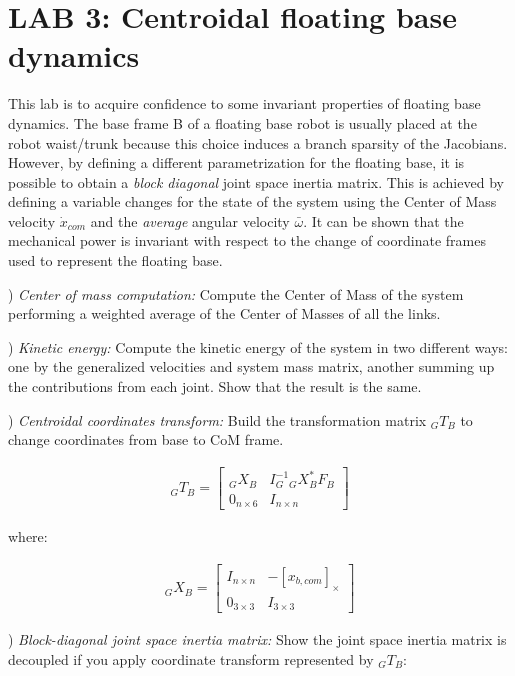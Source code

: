 \documentclass{report}
\newcommand{\mat}[1]{\ensuremath{\begin{bmatrix}#1\end{bmatrix}}}	%
\begin{document}
\section*{LAB 3: Centroidal floating base  dynamics}

This lab is to acquire confidence to some invariant properties of floating base dynamics. 
The base frame B of a floating base robot is usually placed at the robot waist/trunk because this choice induces a  branch sparsity of the Jacobians. 
However, by defining a different parametrization for the floating base, it is possible to obtain a \textit{block diagonal} joint space inertia matrix.  This is achieved by defining a variable changes for the state of the system using the Center of Mass velocity $\dot{x}_{com}$ and the \textit{average} angular velocity $\bar{\omega}$.  It can be shown that the mechanical power is invariant with respect to the change of coordinate frames used to represent the floating base. 

\quad

) \textit{Center of mass computation:}
Compute the Center of Mass of the system performing a weighted average of the Center of Masses of all the links. 

\quad

) \textit{Kinetic energy:}
Compute the kinetic energy of the system in two different ways: one by the generalized velocities and system mass matrix, another summing up the contributions from each joint. Show that the result is the same. 

\quad

) \textit{Centroidal coordinates transform:} 
Build the transformation matrix ${}_GT_B$ to change coordinates from base to CoM frame.


\begin{align}
{}_GT_B  = \mat{    {}_GX_B  & I_G^{-1} {}_GX_B^{*} F_B  \\ 0_{n \times 6} &   I_{n \times n} }
\end{align}

where: 

\begin{align}
 {}_GX_B = \mat{ I_{n \times n}  & -[x_{b, com}]_{\times} \\ 0_{3 \times 3} & 	 I_{3 \times 3}}
 	\label{fig:}
\end{align}

\quad

) \textit{Block-diagonal joint space inertia matrix:}
Show the joint space inertia  matrix is decoupled if you apply coordinate transform represented by  ${}_GT_B$:
\end{document}
